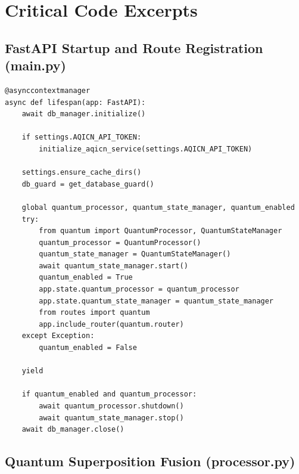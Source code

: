 \documentclass[12pt,a4paper]{article}
\begin{document}
\clearpage

\section{Critical Code Excerpts}
\label{app:code}

\subsection{FastAPI Startup and Route Registration (main.py)}
\label{app:code:startup}

\begin{lstlisting}[caption={Backend startup sequence (backend/main.py)},
                   label=lst:startup]
@asynccontextmanager
async def lifespan(app: FastAPI):
    await db_manager.initialize()

    if settings.AQICN_API_TOKEN:
        initialize_aqicn_service(settings.AQICN_API_TOKEN)

    settings.ensure_cache_dirs()
    db_guard = get_database_guard()

    global quantum_processor, quantum_state_manager, quantum_enabled
    try:
        from quantum import QuantumProcessor, QuantumStateManager
        quantum_processor = QuantumProcessor()
        quantum_state_manager = QuantumStateManager()
        await quantum_state_manager.start()
        quantum_enabled = True
        app.state.quantum_processor = quantum_processor
        app.state.quantum_state_manager = quantum_state_manager
        from routes import quantum
        app.include_router(quantum.router)
    except Exception:
        quantum_enabled = False

    yield

    if quantum_enabled and quantum_processor:
        await quantum_processor.shutdown()
        await quantum_state_manager.stop()
    await db_manager.close()
\end{lstlisting}

\subsection{Quantum Superposition Fusion (processor.py)}
\label{app:code:quantum}
\end{document}

